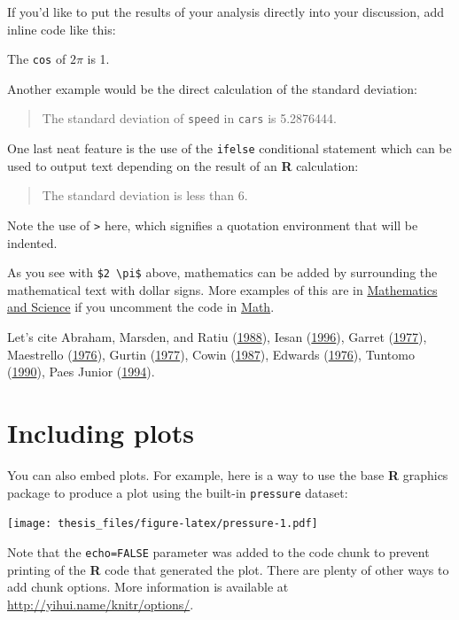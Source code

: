 \documentclass[msc,numbers]{coppe}
\begin{document}
  If you'd like to put the results of your analysis directly into your discussion, add inline code like this:
  
  The \texttt{cos} of \(2 \pi\) is 1.
  
  Another example would be the direct calculation of the standard deviation:
  \begin{quote}
  The standard deviation of \texttt{speed} in \texttt{cars} is 5.2876444.
  \end{quote}
  One last neat feature is the use of the \texttt{ifelse} conditional statement which can be used to output text depending on the result of an \textbf{R} calculation:
  \begin{quote}
  The standard deviation is less than 6.
  \end{quote}
  Note the use of \texttt{\textgreater{}} here, which signifies a quotation environment that will be indented.
  
  As you see with \texttt{\$2\ \textbackslash{}pi\$} above, mathematics can be added by surrounding the mathematical text with dollar signs. More examples of this are in \protect\hyperlink{math-sci}{Mathematics and Science} if you uncomment the code in \protect\hyperlink{math}{Math}.
  
  Let's cite Abraham, Marsden, and Ratiu (\protect\hyperlink{ref-book-example}{1988}), Iesan (\protect\hyperlink{ref-article-example}{1996}), Garret (\protect\hyperlink{ref-techreport-exampleIn}{1977}), Maestrello (\protect\hyperlink{ref-techreport-example}{1976}), Gurtin (\protect\hyperlink{ref-inproceedings-example}{1977}), Cowin (\protect\hyperlink{ref-incollection-example}{1987}), Edwards (\protect\hyperlink{ref-inbook-example}{1976}), Tuntomo (\protect\hyperlink{ref-mastersthesis-example}{1990}), Paes Junior (\protect\hyperlink{ref-phdthesis-example}{1994}).
  
  \hypertarget{including-plots}{%
  \section{Including plots}\label{including-plots}}
  
  You can also embed plots. For example, here is a way to use the base \textbf{R} graphics package to produce a plot using the built-in \texttt{pressure} dataset:
  
  \texttt{[image: thesis\_files/figure-latex/pressure-1.pdf]}
  
  Note that the \texttt{echo=FALSE} parameter was added to the code chunk to prevent printing of the \textbf{R} code that generated the plot. There are plenty of other ways to add chunk options. More information is available at \url{http://yihui.name/knitr/options/}.
  
\end{document}
